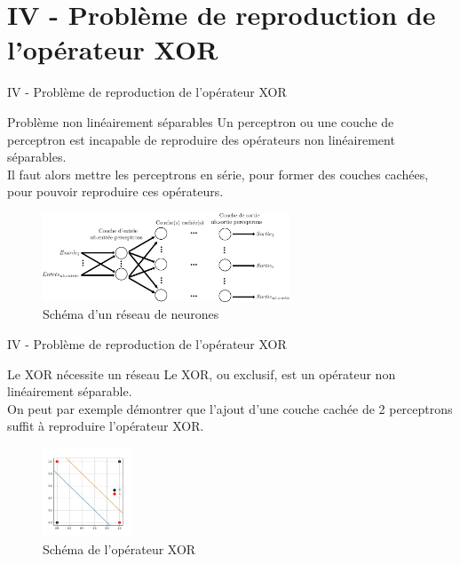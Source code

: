 \documentclass[10pt]{beamer}
\begin{document}
\section{IV - Problème de reproduction de l'opérateur XOR}
\begin{frame}{IV - Problème de reproduction de l'opérateur XOR}
\begin{block}{Problème non linéairement séparables}
Un perceptron ou une couche de perceptron est incapable de reproduire des opérateurs non linéairement séparables. \\
Il faut alors mettre les perceptrons en série, pour former des couches cachées, pour pouvoir reproduire ces opérateurs. \\
\end{block}
\begin{figure}
	\centering
    \includegraphics[height=100px]{1-Reseau.png}
	\caption{Schéma d'un réseau de neurones}
\end{figure}
\end{frame}

\begin{frame}{IV - Problème de reproduction de l'opérateur XOR}
\begin{block}{Le XOR nécessite un réseau}
Le XOR, ou exclusif, est un opérateur non linéairement séparable. \\
On peut par exemple démontrer que l'ajout d'une couche cachée de 2 perceptrons suffit à reproduire l'opérateur XOR. \\
\begin{figure}
	\centering
    \includegraphics[width=100px]{2-XOR.jpg}
	\caption{Schéma de l'opérateur XOR}
\end{figure}
\end{block}	
\end{frame}
\end{document}
